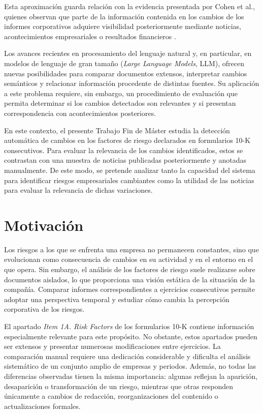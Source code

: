 Esta aproximación guarda relación con la evidencia presentada por
Cohen et al., quienes observan que parte de la información contenida
en los cambios de los informes corporativos adquiere visibilidad
posteriormente mediante noticias, acontecimientos empresariales o
resultados financieros \cite{cohen_malloy_nguyen_lazy_prices}.

Los avances recientes en procesamiento del lenguaje natural y, en particular, en modelos de lenguaje de gran tamaño (\textit{Large Language Models}, LLM), ofrecen nuevas posibilidades para comparar documentos extensos, interpretar cambios semánticos y relacionar información procedente de distintas fuentes. Su aplicación a este problema requiere, sin embargo, un procedimiento de evaluación que permita determinar si los cambios detectados son relevantes y si presentan correspondencia con acontecimientos posteriores.

En este contexto, el presente Trabajo Fin de Máster estudia la detección automática de cambios en los factores de riesgo declarados en formularios 10-K consecutivos. Para evaluar la relevancia de los cambios identificados, estos se contrastan con una muestra de noticias publicadas posteriormente y anotadas manualmente. De este modo, se pretende analizar tanto la capacidad del sistema para identificar riesgos empresariales cambiantes como la utilidad de las noticias para evaluar la relevancia de dichas variaciones.

\section{Motivación}

Los riesgos a los que se enfrenta una empresa no permanecen constantes, sino que evolucionan como consecuencia de cambios en su actividad y en el entorno en el que opera. Sin embargo, el análisis de los factores de riesgo suele realizarse sobre documentos aislados, lo que proporciona una visión estática de la situación de la compañía. Comparar informes correspondientes a ejercicios consecutivos permite adoptar una perspectiva temporal y estudiar cómo cambia la percepción corporativa de los riesgos.

El apartado \textit{Item 1A. Risk Factors} de los formularios 10-K contiene información especialmente relevante para este propósito. No obstante, estos apartados pueden ser extensos y presentar numerosas modificaciones entre ejercicios. La comparación manual requiere una dedicación considerable y dificulta el análisis sistemático de un conjunto amplio de empresas y periodos. Además, no todas las diferencias observadas tienen la misma importancia: algunas reflejan la aparición, desaparición o transformación de un riesgo, mientras que otras responden únicamente a cambios de redacción, reorganizaciones del contenido o actualizaciones formales.

